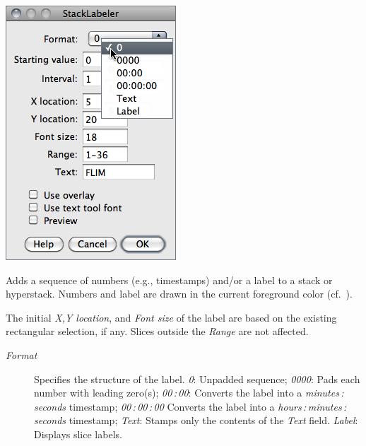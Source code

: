 \begin{minipage}[c][1\totalheight][t]{0.35\columnwidth}%
\includegraphics[scale=0.55]{images/Label}%
\end{minipage}%
\begin{minipage}[c][1\totalheight][t]{0.65\columnwidth}%
Adds a sequence of numbers (e.g., timestamps) and/or a label to a
stack or hyperstack. Numbers and label are drawn in the current foreground
color (cf.\ ).
\medskip{}


The initial \emph{X,Y location}, and \emph{Font size} of the label
are based on the existing rectangular selection, if any. Slices outside
the \emph{Range} are not affected.
\begin{description}
\item [{\emph{Format}}] Specifies the structure of the label. \emph{0}:
Unpadded sequence; \emph{0000}: Pads each number with leading zero(s);
\emph{00\,:\,00}: Converts the label into a \emph{minutes\,:\,seconds}
timestamp; \emph{00\,:\,00\,:\,00} Converts the label into a \emph{hours\,:\,minutes\,:\,seconds}
timestamp; \emph{Text}: Stamps only the contents of the \emph{Text}
field. \emph{Label}: Displays slice labels. \end{description}
%
\end{minipage}
